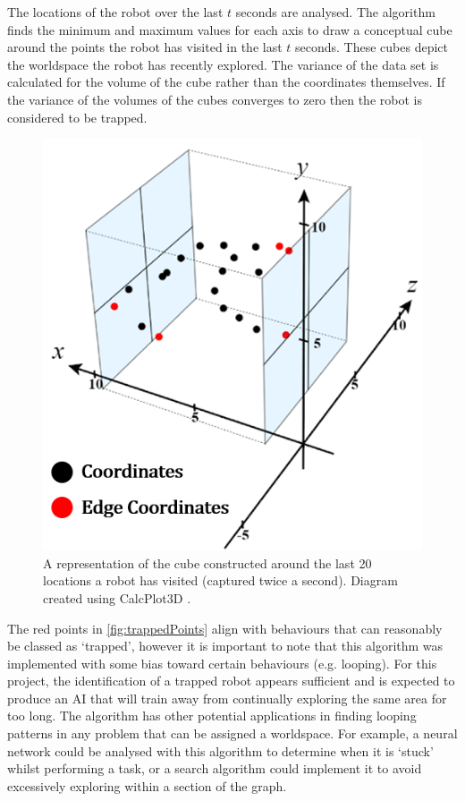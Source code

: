 \documentclass{article}
\begin{document}
The locations of the robot over the last $t$ seconds are analysed. The algorithm finds the minimum and maximum values for each axis to draw a conceptual cube around the points the robot has visited in the last $t$ seconds. These cubes depict the  worldspace the robot has recently explored. The variance of the data set is calculated for the volume of the cube rather than the coordinates themselves. If the variance of the volumes of the cubes converges to zero then the robot is considered to be trapped. \\
\begin{figure}[H]
\centering
\includegraphics[scale=0.5]{trappedAlgorithm}
\caption{A representation of the cube constructed around the last 20 locations a robot has visited (captured twice a second). Diagram created using CalcPlot3D \citep{diagrams}.}
\end{figure}

The red points in \autoref{fig:trappedPoints} align with behaviours that can reasonably be classed as ‘trapped’, however it is important to note that this algorithm was implemented with some bias toward certain behaviours (e.g. looping). For this project, the identification of a trapped robot appears sufficient and is expected to produce an AI that will train away from continually exploring the same area for too long. The algorithm has other potential applications in finding looping patterns in any problem that can be assigned a worldspace. For example, a neural network could be analysed with this algorithm to determine when it is ‘stuck’ whilst performing a task, or a search algorithm could implement it to avoid excessively exploring within a section of the graph. 
\end{document}
